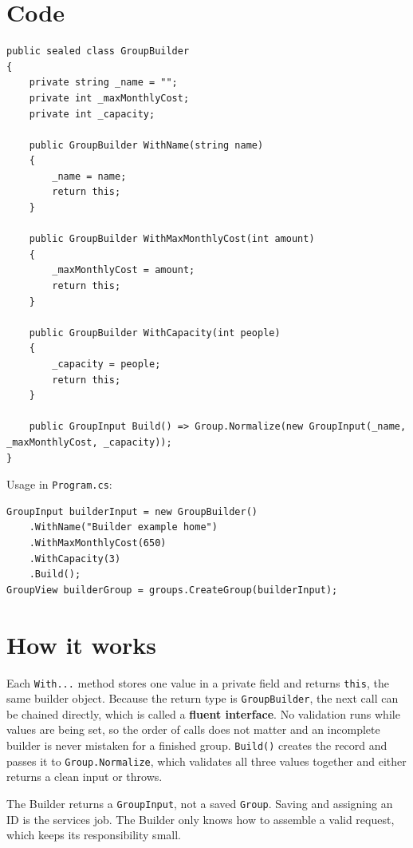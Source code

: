 \documentclass{utmreport}
\providecommand{\passthrough}[1]{#1}
\begin{document}
\section{Code}

\begin{lstlisting}
public sealed class GroupBuilder
{
    private string _name = "";
    private int _maxMonthlyCost;
    private int _capacity;

    public GroupBuilder WithName(string name)
    {
        _name = name;
        return this;
    }

    public GroupBuilder WithMaxMonthlyCost(int amount)
    {
        _maxMonthlyCost = amount;
        return this;
    }

    public GroupBuilder WithCapacity(int people)
    {
        _capacity = people;
        return this;
    }

    public GroupInput Build() => Group.Normalize(new GroupInput(_name, _maxMonthlyCost, _capacity));
}
\end{lstlisting}

Usage in \passthrough{\lstinline!Program.cs!}:

\begin{lstlisting}
GroupInput builderInput = new GroupBuilder()
    .WithName("Builder example home")
    .WithMaxMonthlyCost(650)
    .WithCapacity(3)
    .Build();
GroupView builderGroup = groups.CreateGroup(builderInput);
\end{lstlisting}

\section{How it works}

Each \passthrough{\lstinline!With...!} method stores one value in a private field and returns \passthrough{\lstinline!this!}, the same builder object. Because the return type is \passthrough{\lstinline!GroupBuilder!}, the next call can be chained directly, which is called a \textbf{fluent interface}. No validation runs while values are being set, so the order of calls does not matter and an incomplete builder is never mistaken for a finished group. \passthrough{\lstinline!Build()!} creates the record and passes it to \passthrough{\lstinline!Group.Normalize!}, which validates all three values together and either returns a clean input or throws.

The Builder returns a \passthrough{\lstinline!GroupInput!}, not a saved \passthrough{\lstinline!Group!}. Saving and assigning an ID is the service\textquotesingle s job. The Builder only knows how to assemble a valid request, which keeps its responsibility small.
\end{document}
